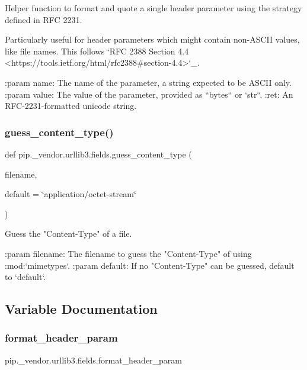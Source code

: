 \begin{DoxyVerb}Helper function to format and quote a single header parameter using the
strategy defined in RFC 2231.

Particularly useful for header parameters which might contain
non-ASCII values, like file names. This follows
`RFC 2388 Section 4.4 <https://tools.ietf.org/html/rfc2388#section-4.4>`_.

:param name:
    The name of the parameter, a string expected to be ASCII only.
:param value:
    The value of the parameter, provided as ``bytes`` or `str``.
:ret:
    An RFC-2231-formatted unicode string.
\end{DoxyVerb}
 \mbox{\label{namespacepip_1_1__vendor_1_1urllib3_1_1fields_a70ea8eadc6184dbba7b43f84471307a6}} 
\subsubsection{\texorpdfstring{guess\+\_\+content\+\_\+type()}{guess\_content\_type()}}
{\footnotesize\ttfamily def pip.\+\_\+vendor.\+urllib3.\+fields.\+guess\+\_\+content\+\_\+type (\begin{DoxyParamCaption}\item[{}]{filename,  }\item[{}]{default = {\ttfamily \char`\"{}application/octet-\/stream\char`\"{}} }\end{DoxyParamCaption})}

\begin{DoxyVerb}Guess the "Content-Type" of a file.

:param filename:
    The filename to guess the "Content-Type" of using :mod:`mimetypes`.
:param default:
    If no "Content-Type" can be guessed, default to `default`.
\end{DoxyVerb}
 

\subsection{Variable Documentation}
\mbox{\label{namespacepip_1_1__vendor_1_1urllib3_1_1fields_a70f74bb977787712470e278b7183fe8e}} 
\subsubsection{\texorpdfstring{format\+\_\+header\+\_\+param}{format\_header\_param}}
{\footnotesize\ttfamily pip.\+\_\+vendor.\+urllib3.\+fields.\+format\+\_\+header\+\_\+param}

